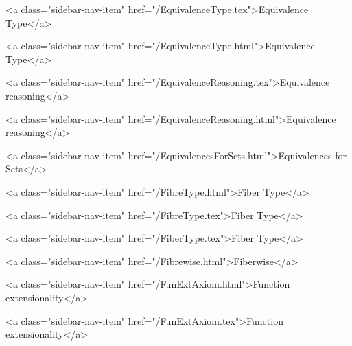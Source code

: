       
    
      
        
          <a class="sidebar-nav-item" href="/EquivalenceType.tex">Equivalence Type</a>
        
      
    
      
        
          <a class="sidebar-nav-item" href="/EquivalenceType.html">Equivalence Type</a>
        
      
    
      
        
          <a class="sidebar-nav-item" href="/EquivalenceReasoning.tex">Equivalence reasoning</a>
        
      
    
      
        
          <a class="sidebar-nav-item" href="/EquivalenceReasoning.html">Equivalence reasoning</a>
        
      
    
      
        
          <a class="sidebar-nav-item" href="/EquivalencesForSets.html">Equivalences for Sets</a>
        
      
    
      
        
          <a class="sidebar-nav-item" href="/FibreType.html">Fiber Type</a>
        
      
    
      
        
          <a class="sidebar-nav-item" href="/FibreType.tex">Fiber Type</a>
        
      
    
      
        
          <a class="sidebar-nav-item" href="/FiberType.tex">Fiber Type</a>
        
      
    
      
        
          <a class="sidebar-nav-item" href="/Fibrewise.html">Fiberwise</a>
        
      
    
      
        
          <a class="sidebar-nav-item" href="/FunExtAxiom.html">Function extensionality</a>
        
      
    
      
        
          <a class="sidebar-nav-item" href="/FunExtAxiom.tex">Function extensionality</a>
        
